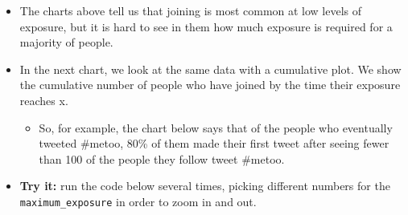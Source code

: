 \documentclass[11pt]{article}
\providecommand{\tightlist}{%
      \setlength{\itemsep}{0pt}\setlength{\parskip}{0pt}}
\begin{document}
\begin{itemize}
\tightlist
\item
  The charts above tell us that joining is most common at low levels of
  exposure, but it is hard to see in them how much exposure is required
  for a majority of people.
\item
  In the next chart, we look at the same data with a cumulative plot. We
  show the cumulative number of people who have joined by the time their
  exposure reaches x.

  \begin{itemize}
  \tightlist
  \item
    So, for example, the chart below says that of the people who
    eventually tweeted \#metoo, 80\% of them made their first tweet
    after seeing fewer than 100 of the people they follow tweet \#metoo.
  \end{itemize}
\item
  \textbf{Try it:} run the code below several times, picking different
  numbers for the \texttt{maximum\_exposure} in order to zoom in and
  out.
\end{itemize}
\end{document}
